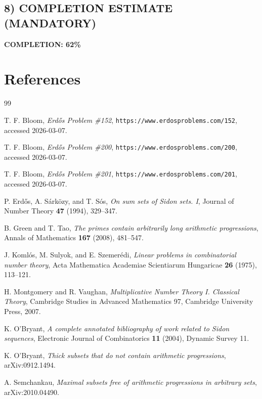 \subsection*{8) COMPLETION ESTIMATE (MANDATORY)}
\textbf{COMPLETION: 62\%}

\bigskip
\section*{References}

\begin{thebibliography}{99}

T. F. Bloom,
\emph{Erd\H{o}s Problem \#152},
\texttt{https://www.erdosproblems.com/152}, accessed 2026-03-07.

T. F. Bloom,
\emph{Erd\H{o}s Problem \#200},
\texttt{https://www.erdosproblems.com/200}, accessed 2026-03-07.

T. F. Bloom,
\emph{Erd\H{o}s Problem \#201},
\texttt{https://www.erdosproblems.com/201}, accessed 2026-03-07.

P. Erd\H{o}s, A. S\'ark\"ozy, and T. S\'os,
\emph{On sum sets of Sidon sets. I},
Journal of Number Theory \textbf{47} (1994), 329--347.

B. Green and T. Tao,
\emph{The primes contain arbitrarily long arithmetic progressions},
Annals of Mathematics \textbf{167} (2008), 481--547.

J. Koml\'os, M. Sulyok, and E. Szemer\'edi,
\emph{Linear problems in combinatorial number theory},
Acta Mathematica Academiae Scientiarum Hungaricae \textbf{26} (1975), 113--121.

H. Montgomery and R. Vaughan,
\emph{Multiplicative Number Theory I. Classical Theory},
Cambridge Studies in Advanced Mathematics 97, Cambridge University Press, 2007.

K. O'Bryant,
\emph{A complete annotated bibliography of work related to Sidon sequences},
Electronic Journal of Combinatorics \textbf{11} (2004), Dynamic Survey 11.

K. O'Bryant,
\emph{Thick subsets that do not contain arithmetic progressions},
arXiv:0912.1494.

A. Semchankau,
\emph{Maximal subsets free of arithmetic progressions in arbitrary sets},
arXiv:2010.04490.

\end{thebibliography}
